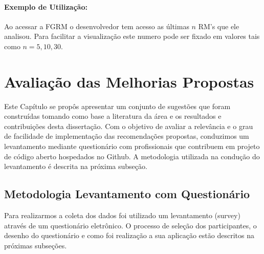 \paragraph{Exemplo de Utilização:}
\label{par:exemplo_de_utilização_s04}
Ao acessar a FGRM o desenvolvedor tem acesso as últimas $n$ RM's que ele analisou.
Para facilitar a visualização este numero pode ser fixado em valores tais como
$n = {5, 10, 30}$.











\section{Avaliação das Melhorias Propostas}
\label{sec:sug_melhoria_avaliacao_das_melhorias}

Este Capítulo se propôs apresentar um conjunto de sugestões que foram
construídas tomando como base a literatura da área e os resultados e
contribuições desta dissertação. Com o objetivo de avaliar a relevância e o grau
de facilidade de implementação das recomendações propostas, conduzimos um
levantamento mediante questionário com profissionais que contribuem em projeto
de código aberto hospedados no Github. A metodologia utilizada na condução do
levantamento é descrita na próxima subseção.

\subsection{Metodologia Levantamento com Questionário}
\label{sub:sug_melhoria_metodologia_levantamento}

Para realizarmos a coleta dos dados foi utilizado um levantamento (survey)
através de um questionário eletrônico. O processo de seleção dos participantes,
o desenho do questionário e como foi realização a sua aplicação estão descritos
na próximas subseções.

